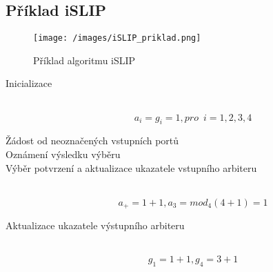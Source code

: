 \subsection{Příklad iSLIP}
\begin{figure}[ht]
\centering
  \begin{center}
    \texttt{[image: /images/iSLIP\_priklad.png]}
  \end{center}
  \caption[Příklad algoritmu iSLIP]{Příklad algoritmu iSLIP}
\end{figure}
\begin{description}
  \item[Inicializace] \hfill \\
  \begin{equation}
      a_i = g_i = 1, pro \,\,\, i = 1, 2, 3, 4
  \end{equation}
  \item [Žádost od neoznačených vstupních portů] \hfill 
  \item [Oznámení výsledku výběru] \hfill 
  \item [Výběr potvrzení a aktualizace ukazatele vstupního arbiteru] \hfill \\
  \begin{equation}
    a_+ = 1 + 1, a_3 = mod_4{(4+1)} = 1
  \end{equation}
  \item [Aktualizace ukazatele výstupního arbiteru] \hfill \\
  \begin{equation}
      g_1 = 1 + 1, g_4 = 3 + 1
  \end{equation}
\end{description}
